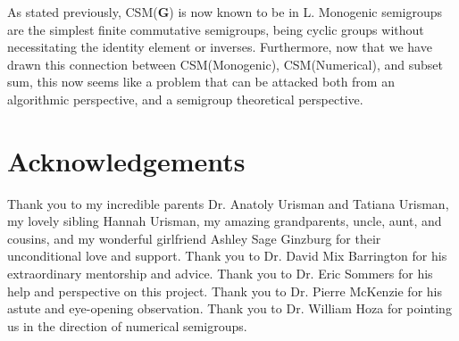 \documentclass[a4paper,12pt]{article}
\theoremstyle{plain}
\theoremstyle{definition}
\theoremstyle{remark}
\begin{document}
As stated previously, CSM(\textbf{G}) is now known to be in L. Monogenic semigroups are the simplest finite commutative semigroups, being cyclic groups without necessitating the identity element or inverses. Furthermore, now that we have drawn this connection between CSM(Monogenic), CSM(Numerical), and subset sum, this now seems like a problem that can be attacked both from an algorithmic perspective, and a semigroup theoretical perspective.

\section{Acknowledgements}
Thank you to my incredible parents Dr. Anatoly Urisman and Tatiana Urisman, my lovely sibling Hannah Urisman, my amazing grandparents, uncle, aunt, and cousins, and my wonderful girlfriend Ashley Sage Ginzburg for their unconditional love and support. Thank you to Dr. David Mix Barrington for his extraordinary mentorship and advice. Thank you to Dr. Eric Sommers for his help and perspective on this project. Thank you to Dr. Pierre McKenzie for his astute and eye-opening observation. Thank you to Dr. William Hoza for pointing us in the direction of numerical semigroups. 

\printbibliography
\end{document}
